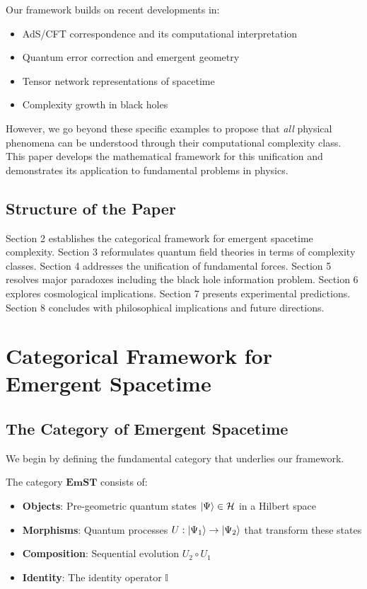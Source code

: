\documentclass[12pt,a4paper]{article}
\newcommand{\hilb}{\mathcal{H}}
\newcommand{\emst}{\mathbf{EmST}}
\begin{document}
Our framework builds on recent developments in:
\begin{itemize}
\item AdS/CFT correspondence and its computational interpretation \cite{susskind2016computational,brown2016holographic}
\item Quantum error correction and emergent geometry \cite{almheiri2015bulk,pastawski2015holographic}
\item Tensor network representations of spacetime \cite{swingle2012entanglement,qi2013exact}
\item Complexity growth in black holes \cite{stanford2014complexity,brown2018second}
\end{itemize}

However, we go beyond these specific examples to propose that \textit{all} physical phenomena can be understood through their computational complexity class. This paper develops the mathematical framework for this unification and demonstrates its application to fundamental problems in physics.

\subsection{Structure of the Paper}

Section 2 establishes the categorical framework for emergent spacetime complexity. Section 3 reformulates quantum field theories in terms of complexity classes. Section 4 addresses the unification of fundamental forces. Section 5 resolves major paradoxes including the black hole information problem. Section 6 explores cosmological implications. Section 7 presents experimental predictions. Section 8 concludes with philosophical implications and future directions.

\section{Categorical Framework for Emergent Spacetime}

\subsection{The Category of Emergent Spacetime}

We begin by defining the fundamental category that underlies our framework.

\begin{definition}
The category $\emst$ consists of:
\begin{itemize}
\item \textbf{Objects}: Pre-geometric quantum states $\ket{\Psi} \in \hilb$ in a Hilbert space
\item \textbf{Morphisms}: Quantum processes $U: \ket{\Psi_1} \to \ket{\Psi_2}$ that transform these states
\item \textbf{Composition}: Sequential evolution $U_2 \circ U_1$
\item \textbf{Identity}: The identity operator $\mathbb{I}$
\end{itemize}
\end{definition}
\end{document}
